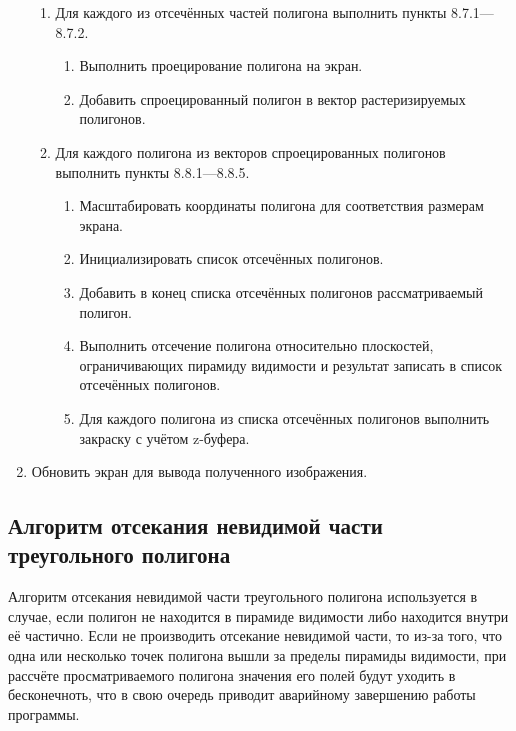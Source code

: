 \begin{enumerate}
\begin{enumerate}
\item Для каждого из отсечённых частей полигона выполнить пункты 8.7.1---8.7.2.
\begin{enumerate}
\item Выполнить проецирование полигона на экран.
\item Добавить спроецированный полигон в вектор растеризируемых полигонов.
\end{enumerate}
\item Для каждого полигона из векторов спроецированных полигонов выполнить пункты 8.8.1---8.8.5.
\begin{enumerate}
\item Масштабировать координаты полигона для соответствия размерам экрана.
\item Инициализировать список отсечённых полигонов.
\item Добавить в конец списка отсечённых полигонов рассматриваемый полигон.
\item Выполнить отсечение полигона относительно плоскостей, ограничивающих пирамиду видимости и результат записать в список отсечённых полигонов.
\item Для каждого полигона из списка отсечённых полигонов выполнить закраску с учётом z-буфера.
\end{enumerate}
\end{enumerate}
\item Обновить экран для вывода полученного изображения.
\end{enumerate}

\subsection{Алгоритм отсекания невидимой части треугольного полигона}
Алгоритм отсекания невидимой части треугольного полигона используется в случае, если полигон не находится в пирамиде видимости либо находится внутри её частично. Если не производить отсекание невидимой части, то из-за того, что одна или несколько точек полигона вышли за пределы пирамиды видимости, при рассчёте просматриваемого полигона значения его полей будут уходить в бесконечноть, что в свою очередь приводит аварийному завершению работы программы.

